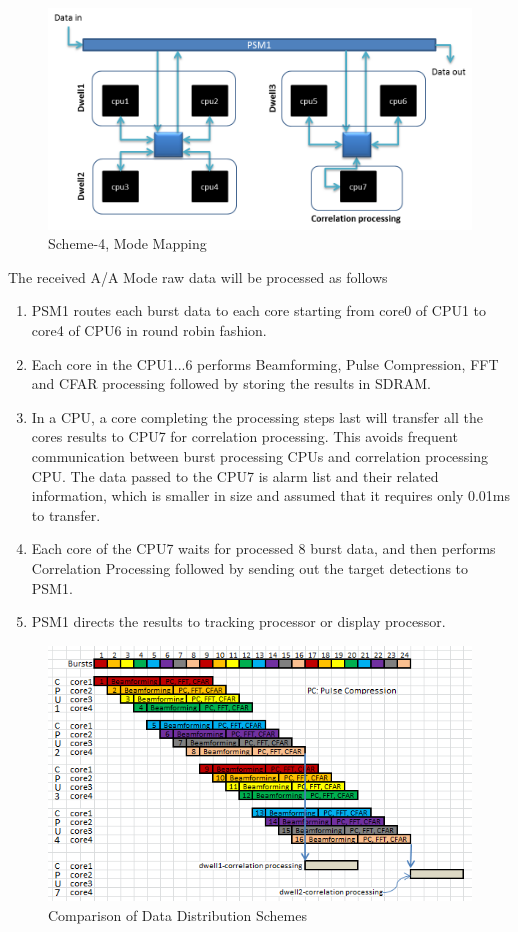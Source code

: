 \begin{figure}[h!]
	\centering
	\includegraphics[width=160mm]{figures/scheme4_aa_mode_mapping}
	\caption{Scheme-4, Mode Mapping}
	\label{fig:mm:scheme4_aa_mode_mapping}
\end{figure}

The received A/A Mode raw data will be processed as follows

\begin{enumerate}
\item PSM1 routes each burst data to each core starting from core0 of CPU1 to core4 of CPU6 in round robin fashion.
\item Each core in the CPU1...6 performs Beamforming, Pulse Compression, FFT and CFAR processing followed by storing the results in SDRAM.
\item In a CPU, a core completing the processing steps last will transfer all the cores results to CPU7 for correlation processing. This avoids frequent communication between burst processing CPUs and correlation processing CPU. The data passed to the CPU7 is alarm list and their related information, which is smaller in size and assumed that it requires only 0.01ms to transfer.
\item Each core of the CPU7 waits for processed 8 burst data, and then performs Correlation Processing followed by sending out the target detections to PSM1.
\item PSM1 directs the results to tracking processor or display processor.
\end{enumerate}

\begin{figure}[h!]
	\centering
	\includegraphics[]{figures/scheme4_data_distribution}
	\caption{Comparison of Data Distribution Schemes}
	\label{fig:mm:scheme4_data_distribution}
\end{figure}

